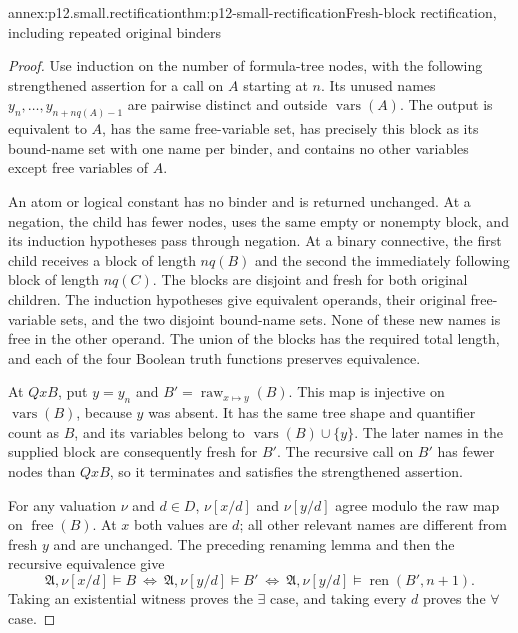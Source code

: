 \begin{annexitem}{annex:p12.small.rectification}{thm:p12-small-rectification}{Fresh-block rectification, including repeated original binders}
\begin{proof}
Use induction on the number of formula-tree nodes, with the following
strengthened assertion for a call on \(A\) starting at \(n\).
Its unused names \(y_n,\ldots,y_{n+nq(A)-1}\) are pairwise
distinct and outside \(\operatorname{vars}(A)\). The output is
equivalent to \(A\), has the same free-variable set, has precisely
this block as its bound-name set with one name per binder, and
contains no other variables except free variables of \(A\).

An atom or logical constant has no binder and is returned unchanged.
At a negation, the child has fewer nodes, uses the same empty or
nonempty block, and its induction hypotheses pass through negation.
At a binary connective, the first child receives a block of length
\(nq(B)\) and the second the immediately following block of
length \(nq(C)\). The blocks are disjoint and fresh for both
original children. The induction hypotheses give equivalent
operands, their original free-variable sets, and the two disjoint
bound-name sets. None of these new names is free in the other
operand. The union of the blocks has the required total length,
and each of the four Boolean truth functions preserves equivalence.

At \(Qx B\), put \(y=y_n\) and
\(B'=\operatorname{raw}_{x\mapsto y}(B)\). This map is injective
on \(\operatorname{vars}(B)\), because \(y\) was absent.
It has the same tree shape and quantifier count as \(B\), and
its variables belong to \(\operatorname{vars}(B)\cup\{y\}\).
The later names in the supplied block are consequently fresh for
\(B'\). The recursive call on \(B'\) has fewer nodes than
\(Qx B\), so it terminates and satisfies the strengthened assertion.

For any valuation \(\nu\) and \(d\in D\),
\(\nu[x/d]\) and \(\nu[y/d]\) agree modulo the raw map on
\(\operatorname{free}(B)\). At \(x\) both values are \(d\);
all other relevant names are different from fresh \(y\) and are
unchanged. The preceding renaming lemma and then the recursive
equivalence give
\[
 \mathfrak A,\nu[x/d]\models B
 \ \Longleftrightarrow\ 
 \mathfrak A,\nu[y/d]\models B'
 \ \Longleftrightarrow\ 
 \mathfrak A,\nu[y/d]\models\operatorname{ren}(B',n+1).
\]
Taking an existential witness proves the \(\exists\) case, and
taking every \(d\) proves the \(\forall\) case.


\end{proof}
\end{annexitem}
